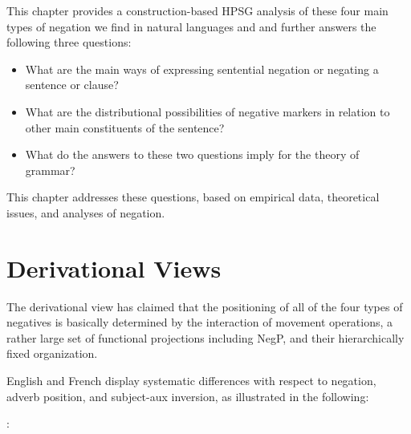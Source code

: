 \documentclass[output=paper]{langsci/langscibook}
\begin{document}
This chapter provides a construction-based HPSG analysis of these four main types of negation we find in natural languages  and and further answers the
following three questions:

\begin{itemize}
\item What are the main ways of expressing sentential
negation or negating a sentence or clause?

\item What are the distributional possibilities of
negative markers in
relation to other main constituents of the sentence?

\item What do the answers to these two questions imply for
the theory of grammar?
\end{itemize}

\noindent
This chapter addresses these questions, based on empirical data,
theoretical issues, and analyses of negation.

\section{Derivational Views}

The derivational view has claimed that the positioning of all of the
four types of negatives is basically determined by the interaction of movement
operations, a rather large set of functional projections including NegP,
and their hierarchically fixed organization.


English and French display systematic differences with respect
to negation, adverb position, and subject-aux inversion, as illustrated
in the following:
%


\bigskip

:

\begin{exe}\label{exe:1}
\ex \begin{xlist}
\end{xlist} \end{exe}

\begin{exe}
\ex \begin{xlist}

\end{xlist}\end{exe}
\end{document}
